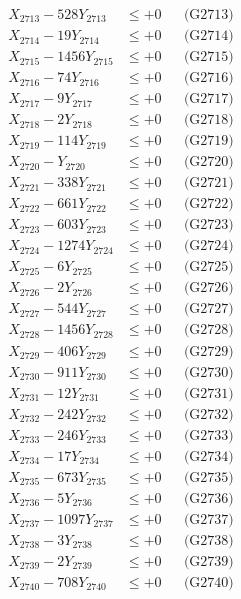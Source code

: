 \documentclass[a4paper,10pt]{article}
\begin{document}
{\begin{align}
X_{2713} - 528Y_{2713} &\leq +0 && \text{(G2713)} \\
X_{2714} - 19Y_{2714} &\leq +0 && \text{(G2714)} \\
X_{2715} - 1456Y_{2715} &\leq +0 && \text{(G2715)} \\
X_{2716} - 74Y_{2716} &\leq +0 && \text{(G2716)} \\
X_{2717} - 9Y_{2717} &\leq +0 && \text{(G2717)} \\
X_{2718} - 2Y_{2718} &\leq +0 && \text{(G2718)} \\
X_{2719} - 114Y_{2719} &\leq +0 && \text{(G2719)} \\
X_{2720} - Y_{2720} &\leq +0 && \text{(G2720)} \\
\allowbreak
X_{2721} - 338Y_{2721} &\leq +0 && \text{(G2721)} \\
X_{2722} - 661Y_{2722} &\leq +0 && \text{(G2722)} \\
X_{2723} - 603Y_{2723} &\leq +0 && \text{(G2723)} \\
X_{2724} - 1274Y_{2724} &\leq +0 && \text{(G2724)} \\
X_{2725} - 6Y_{2725} &\leq +0 && \text{(G2725)} \\
X_{2726} - 2Y_{2726} &\leq +0 && \text{(G2726)} \\
X_{2727} - 544Y_{2727} &\leq +0 && \text{(G2727)} \\
X_{2728} - 1456Y_{2728} &\leq +0 && \text{(G2728)} \\
X_{2729} - 406Y_{2729} &\leq +0 && \text{(G2729)} \\
X_{2730} - 911Y_{2730} &\leq +0 && \text{(G2730)} \\
\allowbreak
X_{2731} - 12Y_{2731} &\leq +0 && \text{(G2731)} \\
X_{2732} - 242Y_{2732} &\leq +0 && \text{(G2732)} \\
X_{2733} - 246Y_{2733} &\leq +0 && \text{(G2733)} \\
X_{2734} - 17Y_{2734} &\leq +0 && \text{(G2734)} \\
X_{2735} - 673Y_{2735} &\leq +0 && \text{(G2735)} \\
X_{2736} - 5Y_{2736} &\leq +0 && \text{(G2736)} \\
X_{2737} - 1097Y_{2737} &\leq +0 && \text{(G2737)} \\
X_{2738} - 3Y_{2738} &\leq +0 && \text{(G2738)} \\
X_{2739} - 2Y_{2739} &\leq +0 && \text{(G2739)} \\
X_{2740} - 708Y_{2740} &\leq +0 && \text{(G2740)} \\

\end{align}}
\end{document}
